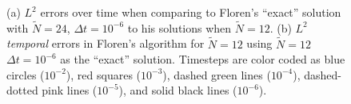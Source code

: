 \begin{figure}
\centering 
{}
\caption{(a) $L^2$ errors over time when comparing to Floren's ``exact'' solution with $\tilde{N}=24$, $\Delta t=10^{-6}$ to his solutions when $\tilde{N}=12$. (b) $L^2$ \textit{temporal} errors in Floren's algorithm for $\tilde{N}=12$ using $\tilde{N}=12$ $\Delta t = 10^{-6}$ as the ``exact'' solution. Timesteps are color coded as blue circles ($10^{-2}$), red squares ($10^{-3}$), dashed green lines ($10^{-4}$), dashed-dotted pink lines ($10^{-5}$), and solid black lines ($10^{-6}$). } 
\label{fig:Flortemp}
\end{figure}

